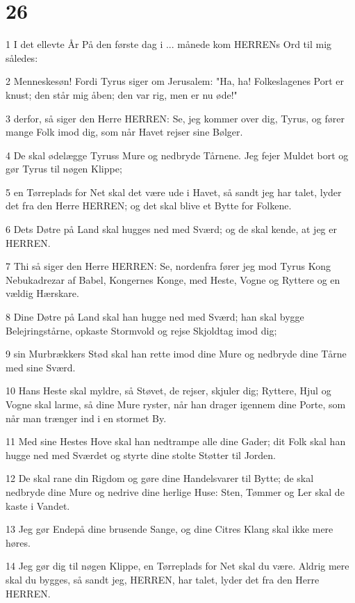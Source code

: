\chapter{26}

\par 1 I det ellevte År På den første dag i ... månede kom HERRENs Ord til mig således:
\par 2 Menneskesøn! Fordi Tyrus siger om Jerusalem: "Ha, ha! Folkeslagenes Port er knust; den står mig åben; den var rig, men er nu øde!"
\par 3 derfor, så siger den Herre HERREN: Se, jeg kommer over dig, Tyrus, og fører mange Folk imod dig, som når Havet rejser sine Bølger.
\par 4 De skal ødelægge Tyruss Mure og nedbryde Tårnene. Jeg fejer Muldet bort og gør Tyrus til nøgen Klippe;
\par 5 en Tørreplads for Net skal det være ude i Havet, så sandt jeg har talet, lyder det fra den Herre HERREN; og det skal blive et Bytte for Folkene.
\par 6 Dets Døtre på Land skal hugges ned med Sværd; og de skal kende, at jeg er HERREN.
\par 7 Thi så siger den Herre HERREN: Se, nordenfra fører jeg mod Tyrus Kong Nebukadrezar af Babel, Kongernes Konge, med Heste, Vogne og Ryttere og en vældig Hærskare.
\par 8 Dine Døtre på Land skal han hugge ned med Sværd; han skal bygge Belejringstårne, opkaste Stormvold og rejse Skjoldtag imod dig;
\par 9 sin Murbrækkers Stød skal han rette imod dine Mure og nedbryde dine Tårne med sine Sværd.
\par 10 Hans Heste skal myldre, så Støvet, de rejser, skjuler dig; Ryttere, Hjul og Vogne skal larme, så dine Mure ryster, når han drager igennem dine Porte, som når man trænger ind i en stormet By.
\par 11 Med sine Hestes Hove skal han nedtrampe alle dine Gader; dit Folk skal han hugge ned med Sværdet og styrte dine stolte Støtter til Jorden.
\par 12 De skal rane din Rigdom og gøre dine Handelsvarer til Bytte; de skal nedbryde dine Mure og nedrive dine herlige Huse: Sten, Tømmer og Ler skal de kaste i Vandet.
\par 13 Jeg gør Endepå dine brusende Sange, og dine Citres Klang skal ikke mere høres.
\par 14 Jeg gør dig til nøgen Klippe, en Tørreplads for Net skal du være. Aldrig mere skal du bygges, så sandt jeg, HERREN, har talet, lyder det fra den Herre HERREN.
